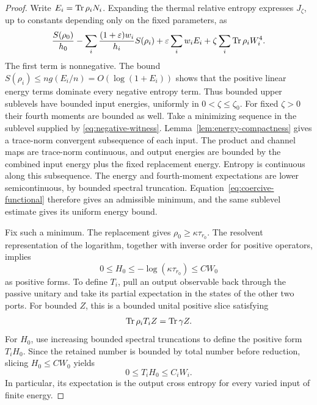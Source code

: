 \begin{proof}
Write $E_i=\operatorname{Tr}\rho_iN_i$. Expanding the thermal relative entropy
expresses $J_\zeta$, up to constants depending only on the fixed
parameters, as
\begin{equation}\label{eq:coercive-functional}
 \frac{S(\rho_0)}{h_0}
 -\sum_i\frac{(1+\varepsilon)w_i}{h_i}S(\rho_i)
 +\varepsilon\sum_i w_iE_i
 +\zeta\sum_i\operatorname{Tr}\rho_iW_i^4.
\end{equation}
The first term is nonnegative. The bound
$S(\rho_i)\le ng(E_i/n)=O(\log(1+E_i))$ shows that the positive linear
energy terms dominate every negative entropy term. Thus bounded upper
sublevels have bounded input energies, uniformly in
$0<\zeta\le\zeta_0$. For fixed $\zeta>0$ their fourth moments are
bounded as well. Take a minimizing sequence in the sublevel supplied
by \eqref{eq:negative-witness}. Lemma~\ref{lem:energy-compactness}
gives a trace-norm convergent subsequence of each input. The product
and channel maps are trace-norm continuous, and output energies are
bounded by the combined input energy plus the fixed replacement
energy. Entropy is continuous along this subsequence. The energy and
fourth-moment expectations are lower semicontinuous, by bounded
spectral truncation. Equation~\eqref{eq:coercive-functional} therefore
gives an admissible minimum, and the same sublevel estimate gives its
uniform energy bound.

Fix such a minimum. The replacement gives $\rho_0\ge\kappa\tau_{r_0}$.
The resolvent representation of the logarithm, together with inverse
order for positive operators, implies
\[
 0\le H_0\le-\log(\kappa\tau_{r_0})\le C W_0
\]
as positive forms. To define $T_i$, pull an output observable back
through the passive unitary and take its partial expectation in the
states of the other two ports. For bounded $Z$, this is a bounded
unital positive slice satisfying
\begin{equation}\label{eq:slice-expectation}
 \operatorname{Tr}\rho_iT_iZ=\operatorname{Tr}\gamma Z.
\end{equation}
For $H_0$, use increasing bounded spectral truncations to define the
positive form $T_iH_0$. Since the retained number is bounded by total
number before reduction, slicing $H_0\le CW_0$ yields
\[
 0\le T_iH_0\le C_iW_i.
\]
In particular, its expectation is the output cross entropy for every
varied input of finite energy.


\end{proof}
